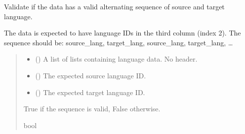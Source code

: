 \documentclass[letterpaper,10pt,english]{sphinxmanual}
\begin{document}
\begin{fulllineitems}
\label{\detokenize{documentation:loanpy.utils.is_valid_language_sequence}}
\pysigstartsignatures
{}
\pysigstopsignatures
\sphinxAtStartPar
Validate if the data has a valid alternating sequence of source and target
language.

\sphinxAtStartPar
The data is expected to have language IDs in the third column (index 2).
The sequence should be: source\_lang, target\_lang, source\_lang,
target\_lang, …
\begin{quote}\begin{description}
\begin{itemize}
\item {} 
\sphinxAtStartPar
{} () \textendash{} A list of lists containing language data. No header.

\item {} 
\sphinxAtStartPar
{} () \textendash{} The expected source language ID.

\item {} 
\sphinxAtStartPar
{} () \textendash{} The expected target language ID.

\end{itemize}

\sphinxAtStartPar
True if the sequence is valid, False otherwise.

\sphinxAtStartPar
bool

\end{description}\end{quote}

\sphinxAtStartPar
{}


\end{fulllineitems}
\end{document}
